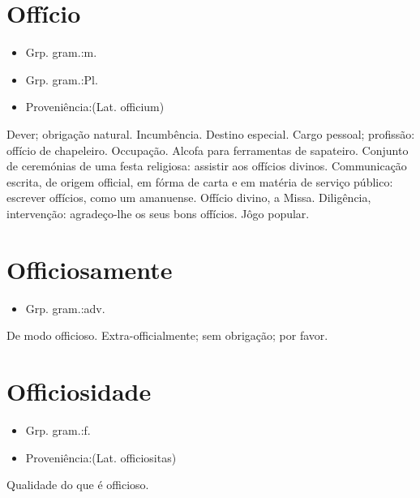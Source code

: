\section{Offício}
\begin{itemize}
\item {Grp. gram.:m.}
\end{itemize}
\begin{itemize}
\item {Grp. gram.:Pl.}
\end{itemize}
\begin{itemize}
\item {Proveniência:(Lat. \textunderscore officium\textunderscore )}
\end{itemize}
Dever; obrigação natural.
Incumbência.
Destino especial.
Cargo pessoal; profissão: \textunderscore offício de chapeleiro\textunderscore .
Occupação.
Alcofa para ferramentas de sapateiro.
Conjunto de ceremónias de uma festa religiosa: \textunderscore assistir aos offícios divinos\textunderscore .
Communicação escrita, de origem official, em fórma de carta e em matéria de serviço público: \textunderscore escrever offícios, como um amanuense\textunderscore .
\textunderscore Offício divino\textunderscore , a Missa.
Diligência, intervenção: \textunderscore agradeço-lhe os seus bons offícios\textunderscore .
Jôgo popular.
\section{Officiosamente}
\begin{itemize}
\item {Grp. gram.:adv.}
\end{itemize}
De modo officioso.
Extra-officialmente; sem obrigação; por favor.
\section{Officiosidade}
\begin{itemize}
\item {Grp. gram.:f.}
\end{itemize}
\begin{itemize}
\item {Proveniência:(Lat. \textunderscore officiositas\textunderscore )}
\end{itemize}
Qualidade do que é officioso.
